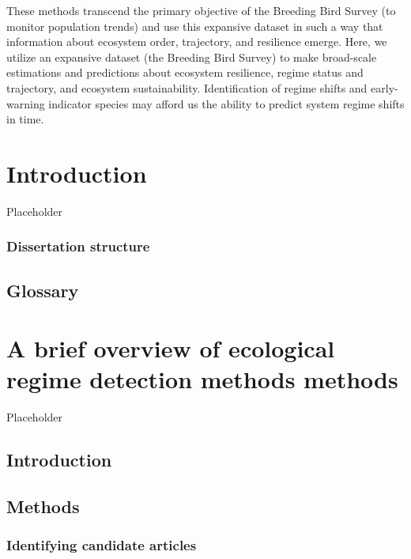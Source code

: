 \documentclass[12pt,twoside,openany]{reedthesis}
\begin{document}
These methods transcend the primary objective of the Breeding Bird Survey (to monitor population trends) and use this expansive dataset in such a way that information about ecosystem order, trajectory, and resilience emerge. Here, we utilize an expansive dataset (the Breeding Bird Survey) to make broad-scale estimations and predictions about ecosystem resilience, regime status and trajectory, and ecosystem sustainability. Identification of regime shifts and early-warning indicator species may afford us the ability to predict system regime shifts in time.

\hypertarget{intro}{%
\chapter{Introduction}\label{intro}}

Placeholder

\hypertarget{dissertation-structure}{%
\subsection{Dissertation structure}\label{dissertation-structure}}

\hypertarget{glossary}{%
\section{Glossary}\label{glossary}}

\hypertarget{rdmReview}{%
\chapter{A brief overview of ecological regime detection methods methods}\label{rdmReview}}

Placeholder

\hypertarget{introduction}{%
\section{Introduction}\label{introduction}}

\hypertarget{methods}{%
\section{Methods}\label{methods}}

\hypertarget{identifying-candidate-articles}{%
\subsection{Identifying candidate articles}\label{identifying-candidate-articles}}
\end{document}
